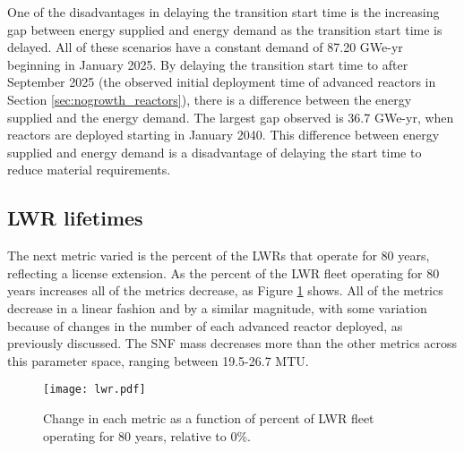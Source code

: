 One of the disadvantages in delaying the transition start time is the 
increasing gap between energy supplied and energy demand as the transition 
start time is delayed. All of these scenarios have a constant demand 
of 87.20 GWe-yr beginning in January 2025. By delaying the transition start 
time to after September 2025 (the observed initial deployment time of advanced 
reactors in Section \ref{sec:nogrowth_reactors}), there is a difference
between the energy supplied and the energy demand. The largest gap observed 
is 36.7
GWe-yr, when reactors are deployed starting in January 2040. This difference 
between energy supplied and energy demand is a disadvantage of delaying 
the start time to reduce material requirements. 

\subsection{LWR lifetimes}
The next metric varied is the percent of the \glspl{LWR} that operate for 
80 years, reflecting a license extension. As the percent of the \gls{LWR} 
fleet operating for 80 years increases all of the metrics decrease, as 
Figure \ref{fig:lwr_scenario7} shows. All of the metrics decrease 
in a linear fashion and by a similar magnitude, with some variation because 
of changes in the number of each advanced reactor deployed, as previously
discussed. The \gls{SNF} mass decreases more than the other metrics across 
this parameter space, ranging between 19.5-26.7 MTU.

\begin{figure}[ht]
    \centering
    \texttt{[image: lwr.pdf]}
    \caption{Change in each metric as a function of percent of LWR fleet  
    operating for 80 years, relative to 0\%.}
    \label{fig:lwr_scenario7}
\end{figure}

